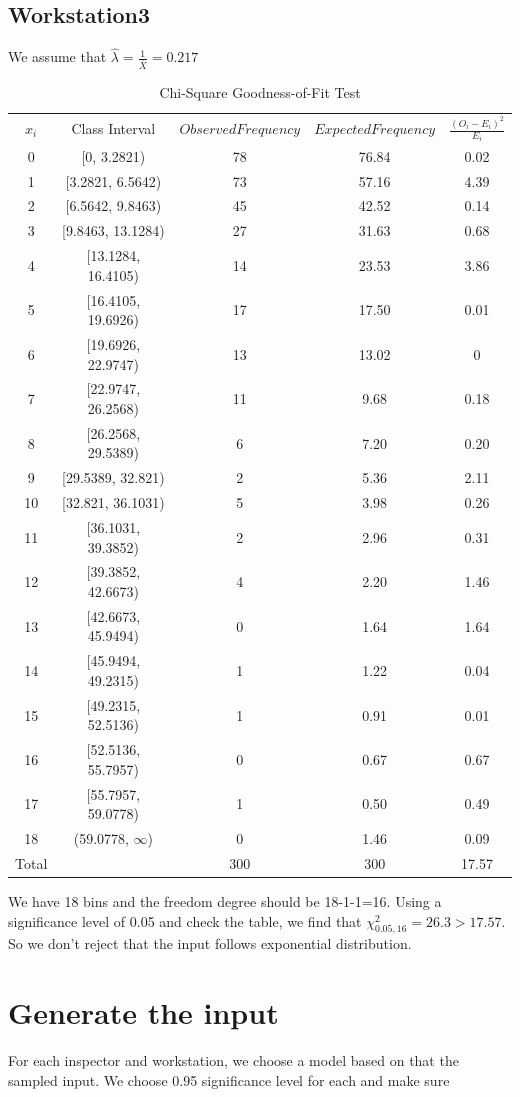 \documentclass{article}
\begin{document}
\subsection{Workstation3}

We assume that $\hat{\lambda}=\frac{1}{\bar{X}}=0.217$
\begin{table}[htp]
\caption{Chi-Square Goodness-of-Fit Test}
\begin{center}
\begin{tabular}{ccccc}
\hline
$x_i$ & Class Interval & $Observed Frequency$ & $Expected Frequency$ & $\frac{(O_i-E_i)^2}{E_i}$\\
0&[0, 3.2821)&78&76.84&0.02\\
1&[3.2821, 6.5642)&73&57.16&4.39\\
2&[6.5642, 9.8463)&45&42.52&0.14\\
3&[9.8463, 13.1284)&27&31.63&0.68\\
4&[13.1284, 16.4105)&14&23.53&3.86\\
5&[16.4105, 19.6926)&17&17.50&0.01\\
6&[19.6926, 22.9747)&13&13.02&0\\
7&[22.9747, 26.2568)&11&9.68&0.18\\
8&[26.2568, 29.5389)&6&7.20&0.20\\
9&[29.5389, 32.821)&2&5.36&2.11\\
10&[32.821, 36.1031)&5&3.98&0.26\\
11&[36.1031, 39.3852)&2&2.96&0.31\\
12&[39.3852, 42.6673)&4&2.20&1.46\\
13&[42.6673, 45.9494)&0&1.64&1.64\\
14&[45.9494, 49.2315)&1&1.22&0.04\\
15&[49.2315, 52.5136)&1&0.91&0.01\\
16&[52.5136, 55.7957)&0&0.67&0.67\\
17&[55.7957, 59.0778)&1&0.50&0.49\\
18&(59.0778, $\infty$)&0&1.46&0.09\\
\hline
Total& &300&300&17.57\\

\hline

\end{tabular}
\end{center}
\label{default}
\end{table}%

We have 18 bins and the freedom degree should be 18-1-1=16. Using a significance level of 0.05 and check the table, we find that $\chi^2_{0.05, 16}=26.3 > 17.57$. So we don't reject that the input follows exponential distribution.

\section{Generate the input}

For each inspector and workstation, we choose a model based on that the sampled input. We choose 0.95 significance level for each and make sure  
\end{document}
